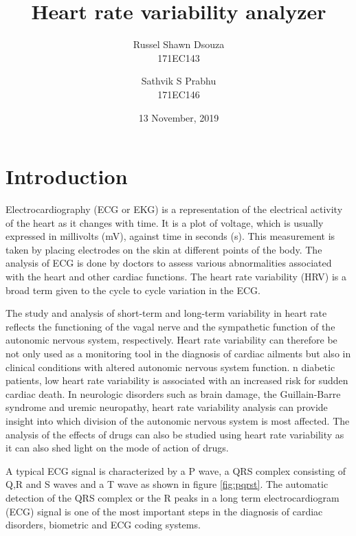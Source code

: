 \documentclass[11pt]{article}
\title{\textbf{Heart rate variability analyzer}}
\author{
  Russel Shawn Dsouza\\
  171EC143
  \and
  Sathvik S Prabhu\\
  171EC146
}
\date{13 November, 2019}
\theoremstyle{definition}
\begin{document}
  \maketitle
  \thispagestyle{empty}

  \newpage
  \tableofcontents
  \thispagestyle{empty}

  \setcounter{page}{1}
  \newpage
  \section{Introduction}
 Electrocardiography (ECG or EKG) is a representation of the electrical activity of the heart as it changes with time. It is a plot of voltage, which is usually expressed in millivolts (mV), against time in seconds (s). This measurement is taken by placing electrodes on the skin at different points of the body. The analysis of ECG is done by doctors to assess various abnormalities associated with the heart and other cardiac functions. The heart rate variability (HRV) is a broad term given to the cycle to cycle variation in the ECG. 
  
  The study and analysis of short-term and long-term variability in heart rate reflects the functioning of the vagal nerve and the sympathetic function of the autonomic nervous system, respectively.
  Heart rate variability can therefore be not only used as a monitoring tool in the diagnosis of cardiac ailments but also in clinical conditions with altered autonomic nervous system function.
  n diabetic patients, low heart rate variability is associated with an increased risk for sudden cardiac death.
  In neurologic disorders such as brain damage, the Guillain-Barre syndrome and uremic neuropathy, heart rate variability analysis can provide insight into which division of the autonomic nervous system is most affected.
  The analysis of the effects of drugs can also be studied using heart rate variability as it can also shed light on the mode of action of drugs.

  A typical ECG signal is characterized by a P wave, a QRS complex consisting of Q,R and S waves and a T wave as shown in figure \ref{fig:pqrst}.
  The automatic detection of the QRS complex or the R peaks in a long term electrocardiogram (ECG) signal is one of the most important steps in the diagnosis of cardiac disorders, biometric and ECG coding systems.
\end{document}
